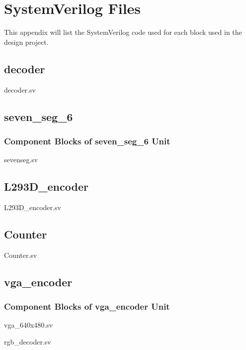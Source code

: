 \documentclass[a4paper]{article}
\begin{document}
\clearpage



\appendix
\section{SystemVerilog Files}
This appendix will list the SystemVerilog code used for each block used in the design project.

\subsection{decoder}
decoder.sv


\subsection{seven\_seg\_6}
\subsubsection{Component Blocks of seven\_seg\_6 Unit}
sevenseg.sv


\clearpage

\subsection{L293D\_encoder}
L293D\_encoder.sv


\subsection{Counter}
Counter.sv


\subsection{vga\_encoder}
\subsubsection{Component Blocks of vga\_encoder Unit}
vga\_640x480.sv


rgb\_decoder.sv

\end{document}
